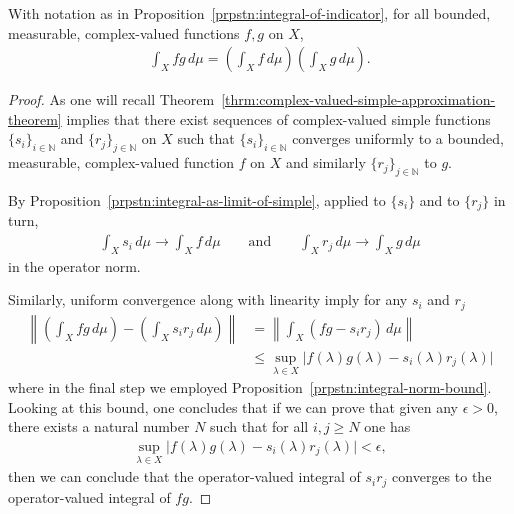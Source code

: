 \begin{proposition}
    \label{prpstn:integral-mult-measurable}
    \leanok
    With notation as in Proposition~\ref{prpstn:integral-of-indicator}, for all bounded, measurable, complex-valued functions $f, g$ on $X$,
    \begin{align}
        \int_X fg \, d\mu = \left( \int_X f \, d\mu \right) \left( \int_X g \, d\mu \right).
    \end{align}
\end{proposition}
\begin{proof}
    \leanok
As one will recall Theorem~\ref{thrm:complex-valued-simple-approximation-theorem} implies that there exist sequences of complex-valued simple functions $\{s_i\}_{i \in \mathbb{N}}$ and $\{r_j\}_{j \in \mathbb{N}}$ on $X$ such that $\{s_i\}_{i \in \mathbb{N}}$ converges uniformly to a bounded, measurable, complex-valued function $f$ on $X$ and similarly $\{r_j\}_{j \in \mathbb{N}}$ to $g$.

By Proposition~\ref{prpstn:integral-as-limit-of-simple}, applied to $\{s_i\}$ and to $\{r_j\}$ in turn,
\begin{align}
    \int_X s_i \, d\mu \longrightarrow \int_X f \, d\mu
    \qquad\text{and}\qquad
    \int_X r_j \, d\mu \longrightarrow \int_X g \, d\mu
\end{align}
in the operator norm.

Similarly, uniform convergence along with linearity imply for any $s_i$ and $r_j$
\begin{align}
    \left\| \left( \int_X fg \, d\mu \right) - \left( \int_X s_i r_j \, d\mu \right) \right\|
    &= \left\| \int_X (fg - s_i r_j) \, d\mu \right\| \\
    &\le \sup\limits_{\lambda \in X} \lvert f(\lambda) g(\lambda) - s_i(\lambda) r_j(\lambda) \rvert
\end{align}
where in the final step we employed Proposition~\ref{prpstn:integral-norm-bound}. Looking at this bound, one concludes that if we can prove that given any $\epsilon > 0$, there exists a natural number $N$ such that for all $i,j \ge N$ one has
\begin{align}
    \sup\limits_{\lambda \in X} \lvert f(\lambda) g(\lambda) - s_i(\lambda) r_j(\lambda) \rvert < \epsilon,
\end{align}
then we can conclude that the operator-valued integral of $s_ir_j$ converges to the operator-valued integral of $fg$.


\end{proof}
